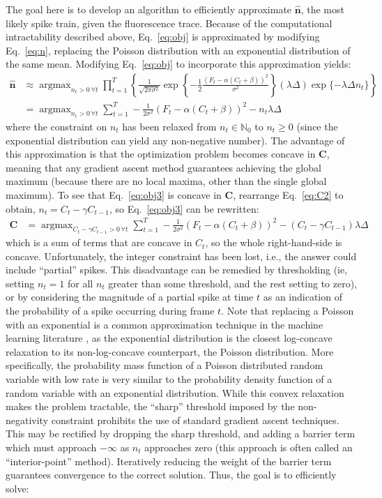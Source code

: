 \documentclass{article}
\providecommand{\ve}[1]{\boldsymbol{#1}}
\DeclareMathOperator*{\argmax}{argmax}
\newcommand{\bC}{\ve{C}}
\newcommand{\hbn}{\widehat{\ve{n}}}
\newcommand{\Del}{\Delta}
\newcommand{\sig}{\sigma}
\newcommand{\lam}{\lambda}
\newcommand{\gam}{\gamma}
\begin{document}
The goal here is to develop an algorithm to efficiently approximate $\hbn$, the most likely spike train, given the fluorescence trace. Because of the computational intractability described above, Eq.~\eqref{eq:obj} is approximated by modifying Eq.~\eqref{eq:n}, replacing the Poisson distribution with an exponential distribution of the same mean. Modifying Eq.~\eqref{eq:obj} to incorporate this approximation yields:
\begin{subequations}
\begin{align} \label{eq:obj2}
\hbn &\approx \argmax_{n_t>0 \, \forall t} \prod_{t=1}^T  \left\{\frac{1}{\sqrt{2 \pi \sig^2}} \exp \left\{-\frac{1}{2}\frac{(F_t - \alpha (C_t + \beta))^2}{\sig^2}\right\}  (\lam\Del) \exp\{-\lam\Del n_t\}\right\}
\\ &= \argmax_{n_t>0 \, \forall t}  \sum_{t=1}^T -\frac{1}{2 \sig^2}(F_t - \alpha(C_t + \beta))^2  - n_t \lam \Del  \label{eq:obj3}
\end{align}
\end{subequations}
where the constraint on $n_t$ has been relaxed from  $n_t \in \mathbb{N}_0$ to $n_t \geq 0$ (since the exponential distribution can yield any non-negative number).  The advantage of this approximation is that the optimization problem becomes concave in $\bC$, meaning that any gradient ascent method guarantees achieving the global maximum (because there are no local maxima, other than the single global maximum).  To see that Eq.~\eqref{eq:obj3} is concave in $\bC$, rearrange Eq.~\eqref{eq:C2} to obtain, $n_t=C_t-\gam C_{t-1}$, so Eq.~\eqref{eq:obj3} can be rewritten:
\begin{align}
\bC &= \argmax_{C_t-\gam C_{t-1}>0 \, \forall t}  \sum_{t=1}^T -\frac{1}{2 \sig^2}(F_t - \alpha(C_t + \beta))^2  - (C_t -\gam C_{t-1}) \lam \Del  \label{eq:obj4}
\end{align}
\noindent which is a sum of terms that are concave in $C_t$, so the whole right-hand-side is concave. Unfortunately, the integer constraint has been lost, i.e.,  the answer could include ``partial'' spikes.  This disadvantage can be remedied by thresholding (ie, setting $n_t=1$ for all $n_t$ greater than some threshold, and the rest setting to zero), or by considering the magnitude of a partial spike at time $t$ as an indication of the probability of a spike occurring during frame $t$. Note that replacing a Poisson with an exponential is a common approximation technique in the machine learning literature \cite{CONV04, PaninskiWu09}, as the exponential distribution is the closest log-concave relaxation to its non-log-concave counterpart, the Poisson distribution. More specifically, the probability mass function of a Poisson distributed random variable with low rate is very similar to the probability density function of a random variable with an exponential distribution. While this convex relaxation makes the problem tractable, the ``sharp'' threshold imposed by the non-negativity constraint prohibits the use of standard gradient ascent techniques. This may be rectified by dropping the sharp threshold, and adding a barrier term which must approach $-\infty$ as $n_t$ approaches zero (this approach is often called an ``interior-point'' method). Iteratively reducing the weight of the barrier term guarantees convergence to the correct solution.  Thus, the goal is to efficiently solve:
\end{document}
